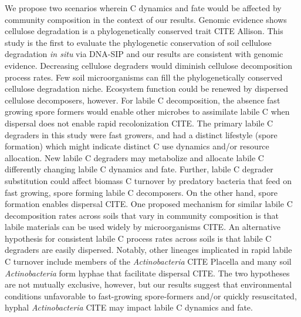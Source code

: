 We propose two scenarios wherein C dynamics and fate would be affected
by community composition in the context of our results. Genomic evidence shows
cellulose degradation is a phylogenetically conserved trait CITE Allison. This
study is the first to evaluate the phylogenetic conservation of soil cellulose
degradation \textit{in situ} via DNA-SIP and our results are consistent with
genomic evidence. Decreasing cellulose degraders would diminish cellulose
decomposition process rates. Few soil microorganisms can fill the
phylogenetically conserved cellulose degradation niche. Ecosystem function
could be renewed by dispersed cellulose decomposers, however. For labile
C decomposition, the absence fast growing spore formers would enable other
microbes to assimilate labile C when dispersal does not enable rapid
recolonization CITE. The primary labile C degraders in this study were fast
growers, and had a distinct lifestyle (spore formation) which might indicate
distinct C use dynamics and/or resource allocation. New labile C degraders may
metabolize and allocate labile C differently changing labile C dynamics and
fate. Further, labile C degrader substitution could affect biomass C turnover
by predatory bacteria that feed on fast growing, spore forming labile
C decomposers. On the other hand, spore formation enables dispersal CITE. One
proposed mechanism for similar labile C decomposition rates across soils that
vary in community composition is that labile materials can be used widely by
microorganisms CITE. An alternative hypothesis for consistent labile C process
rates across soils is that labile C degraders are easily dispersed. Notably,
other lineages implicated in rapid labile C turnover include members of the
\textit{Actinobacteria} CITE Placella and many soil \textit{Actinobacteria}
form hyphae that facilitate dispersal CITE. The two hypotheses are not mutually
exclusive, however, but our results suggest that environmental conditions
unfavorable to fast-growing spore-formers and/or quickly resuscitated, hyphal
\textit{Actinobacteria} CITE may impact labile C dynamics and fate.

